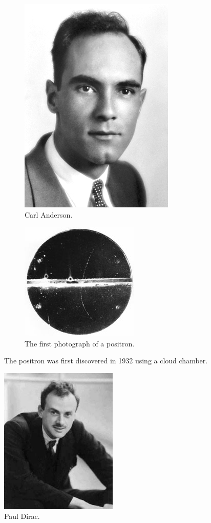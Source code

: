 \documentclass[a4paper]{amsbook}
\theoremstyle{definition}
\numberwithin{exercise}{chapter}
\numberwithin{exercise}{chapter}
\begin{document}
\begin{figure}
  \centering
  \begin{subfigure}{0.4\textwidth}
    \includegraphics[height=0.2\textheight]{anderson}
    \caption{Carl Anderson. \label{fig:anderson}}
  \end{subfigure}\hfill%
  \begin{subfigure}{0.4\textwidth}
    \centering
    \includegraphics[height=0.2\textheight]{positron}
    \caption{The first photograph of a positron. \label{fig:positron}}
  \end{subfigure}
  \caption{The positron was first discovered in 1932 using a cloud chamber.}
\end{figure}

\begin{figure}
  \centering
  \includegraphics[width=0.5\textwidth]{dirac}
  \caption{Paul Dirac. \label{fig:dirac}}
\end{figure}
\end{document}
